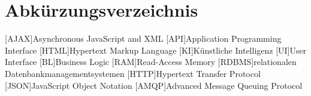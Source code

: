 \section*{Abkürzungsverzeichnis}
\begin{acronym}
	[AJAX]{Asynchronous JavaScript and XML}
	[API]{Application Programming Interface}
	[HTML]{Hypertext Markup Language}
	[KI]{Künstliche Intelligenz}
	[UI]{User Interface}
	[BL]{Business Logic}
	[RAM]{Read-Access Memory}
	[RDBMS]{relationalen Datenbankmanagementsystemen}
	[HTTP]{Hypertext Transfer Protocol}
	[JSON]{JavaScript Object Notation}
	[AMQP]{Advanced Message Queuing Protocol}
\end{acronym}
